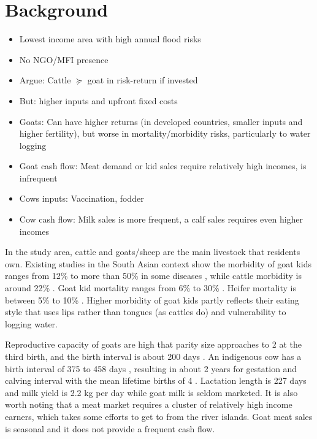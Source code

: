 \section{Background}
\label{SecBackground}

\begin{mdframed}[style={SecItemize}, frametitle={Background}]
\begin{itemize}
\vspace{1.0ex}\setlength{\itemsep}{1.0ex}\setlength{\baselineskip}{12pt}
\item	Lowest income area with high annual flood risks
\item	No NGO/MFI presence
\item	Argue: Cattle $\succcurlyeq$ goat in risk-return if invested
\item	But: higher inputs and upfront fixed costs
\item	Goats: Can have higher returns (in developed countries, smaller inputs and higher fertility), but worse in mortality/morbidity risks, particularly to water logging
\item	Goat cash flow: Meat demand or kid sales require relatively high incomes, is infrequent
\item	Cows inputs: Vaccination, fodder
\item	Cow cash flow: Milk sales is more frequent, a calf sales requires even higher incomes
\end{itemize}
\end{mdframed}

	In the study area, cattle and goats/sheep are the main livestock that residents own. Existing studies in the South Asian context show the morbidity of goat kids ranges from 12\% \citep{Mahmud2015} to more than 50\% in some diseases \citep[][Table 5]{Nandi2011}, while cattle morbidity is around 22\% \citep{Bangar2013}. Goat kid mortality ranges from 6\% \citep{Mahmud2015} to 30\% \citep[][Table 5]{Paul2014} \citep{Ershaduzzaman2007}. Heifer mortality is between 5\% \citep[][p.332R]{Hossain2014} to 10\% \citep{Alauddin2018}. Higher morbidity of goat kids partly reflects their eating style that uses lips rather than tongues (as cattles do) and vulnerability to logging water. 

	Reproductive capacity of goats are high that parity size approaches to 2 at the third birth, and the birth interval is about 200 days \citep{Hasan2014goat}. An indigenous cow has a birth interval of 375 to 458 days \citep{Hasan2018}, resulting in about 2 years for gestation and calving interval \citep{Habib2012} with the mean lifetime births of 4 \citep[][Table 1]{Hasan2018}. Lactation length is 227 days and milk yield is 2.2 kg per day \citep{Rokonuzzaman2009} while goat milk is seldom marketed. It is also worth noting that a meat market requires a cluster of relatively high income earners, which takes some efforts to get to from the river islands. Goat meat sales is seasonal and it does not provide a frequent cash flow. 
	
